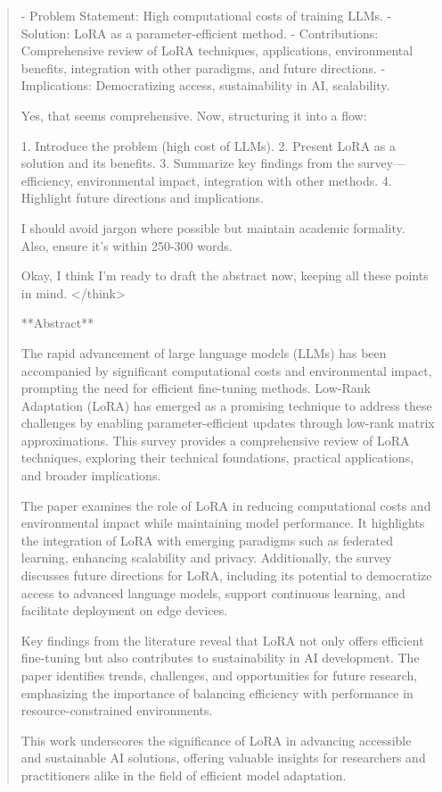 \documentclass[conference]{IEEEtran}
\begin{document}
\begin{abstract}
- Problem Statement: High computational costs of training LLMs.
- Solution: LoRA as a parameter-efficient method.
- Contributions: Comprehensive review of LoRA techniques, applications, environmental benefits, integration with other paradigms, and future directions.
- Implications: Democratizing access, sustainability in AI, scalability.

Yes, that seems comprehensive. Now, structuring it into a flow:

1. Introduce the problem (high cost of LLMs).
2. Present LoRA as a solution and its benefits.
3. Summarize key findings from the survey—efficiency, environmental impact, integration with other methods.
4. Highlight future directions and implications.

I should avoid jargon where possible but maintain academic formality. Also, ensure it's within 250-300 words.

Okay, I think I'm ready to draft the abstract now, keeping all these points in mind.
</think>

**Abstract**

The rapid advancement of large language models (LLMs) has been accompanied by significant computational costs and environmental impact, prompting the need for efficient fine-tuning methods. Low-Rank Adaptation (LoRA) has emerged as a promising technique to address these challenges by enabling parameter-efficient updates through low-rank matrix approximations. This survey provides a comprehensive review of LoRA techniques, exploring their technical foundations, practical applications, and broader implications.

The paper examines the role of LoRA in reducing computational costs and environmental impact while maintaining model performance. It highlights the integration of LoRA with emerging paradigms such as federated learning, enhancing scalability and privacy. Additionally, the survey discusses future directions for LoRA, including its potential to democratize access to advanced language models, support continuous learning, and facilitate deployment on edge devices.

Key findings from the literature reveal that LoRA not only offers efficient fine-tuning but also contributes to sustainability in AI development. The paper identifies trends, challenges, and opportunities for future research, emphasizing the importance of balancing efficiency with performance in resource-constrained environments.

This work underscores the significance of LoRA in advancing accessible and sustainable AI solutions, offering valuable insights for researchers and practitioners alike in the field of efficient model adaptation.
\end{abstract}
\end{document}
